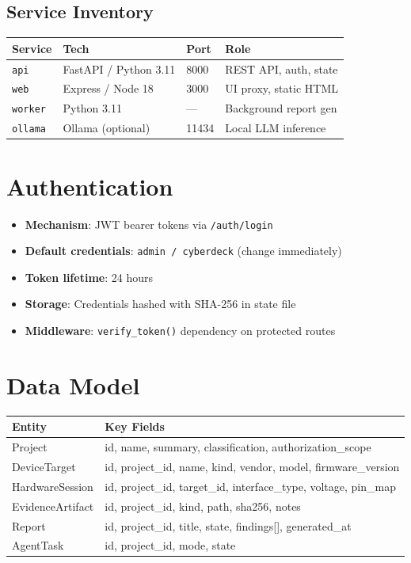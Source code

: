 \documentclass[11pt,a4paper]{article}
\begin{document}
\subsection{Service Inventory}
\begin{tabular}{llll}
\toprule
\textbf{Service} & \textbf{Tech} & \textbf{Port} & \textbf{Role}\\
\midrule
\texttt{api}    & FastAPI / Python 3.11 & 8000 & REST API, auth, state \\
\texttt{web}    & Express / Node 18     & 3000 & UI proxy, static HTML  \\
\texttt{worker} & Python 3.11           & ---  & Background report gen  \\
\texttt{ollama} & Ollama (optional)     & 11434& Local LLM inference    \\
\bottomrule
\end{tabular}

\section{Authentication}
\begin{itemize}
  \item \textbf{Mechanism}: JWT bearer tokens via \texttt{/auth/login}
  \item \textbf{Default credentials}: \texttt{admin / cyberdeck} (change immediately)
  \item \textbf{Token lifetime}: 24 hours
  \item \textbf{Storage}: Credentials hashed with SHA-256 in state file
  \item \textbf{Middleware}: \texttt{verify\_token()} dependency on protected routes
\end{itemize}

\section{Data Model}
\begin{tabular}{ll}
\toprule
\textbf{Entity} & \textbf{Key Fields} \\
\midrule
Project         & id, name, summary, classification, authorization\_scope \\
DeviceTarget    & id, project\_id, name, kind, vendor, model, firmware\_version \\
HardwareSession & id, project\_id, target\_id, interface\_type, voltage, pin\_map \\
EvidenceArtifact& id, project\_id, kind, path, sha256, notes \\
Report          & id, project\_id, title, state, findings[], generated\_at \\
AgentTask       & id, project\_id, mode, state \\
\bottomrule
\end{tabular}
\end{document}
